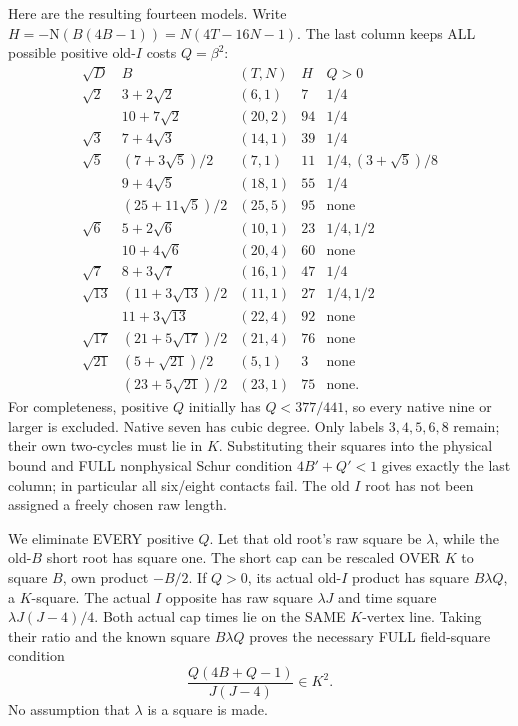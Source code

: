 \documentclass[11pt]{article}
\begin{document}
Here are the resulting fourteen models.
Write \(H=-\mathrm N(B(4B-1))
=N(4T-16N-1)\).
The last column keeps ALL possible
positive old-\(I\) costs \(Q=\beta^2\):
\[
\begin{array}{c|c|c|r|l}
 \sqrt D&B&(T,N)&H&Q>0\\ \hline
 \sqrt2&3+2\sqrt2&(6,1)&7&1/4\\
 &10+7\sqrt2&(20,2)&94&1/4\\
 \sqrt3&7+4\sqrt3&(14,1)&39&1/4\\
 \sqrt5&(7+3\sqrt5)/2&(7,1)&11&1/4,(3+\sqrt5)/8\\
 &9+4\sqrt5&(18,1)&55&1/4\\
 &(25+11\sqrt5)/2&(25,5)&95&\text{none}\\
 \sqrt6&5+2\sqrt6&(10,1)&23&1/4,1/2\\
 &10+4\sqrt6&(20,4)&60&\text{none}\\
 \sqrt7&8+3\sqrt7&(16,1)&47&1/4\\
 \sqrt{13}&(11+3\sqrt{13})/2&(11,1)&27&1/4,1/2\\
 &11+3\sqrt{13}&(22,4)&92&\text{none}\\
 \sqrt{17}&(21+5\sqrt{17})/2&(21,4)&76&\text{none}\\
 \sqrt{21}&(5+\sqrt{21})/2&(5,1)&3&\text{none}\\
 &(23+5\sqrt{21})/2&(23,1)&75&\text{none}.
\end{array}
\]
For completeness, positive \(Q\) initially
has \(Q<377/441\), so every native nine
or larger is excluded.
Native seven has cubic degree.
Only labels \(3,4,5,6,8\) remain;
their own two-cycles must lie in \(K\).
Substituting their squares into the
physical bound and FULL nonphysical
Schur condition \(4B'+Q'<1\) gives
exactly the last column; in particular
all six/eight contacts fail.
The old \(I\) root has not been assigned
a freely chosen raw length.

We eliminate EVERY positive \(Q\).
Let that old root's raw square be
\(\lambda\), while the old-\(B\) short
root has square one.
The short cap can be rescaled OVER \(K\)
to square \(B\), own product \(-B/2\).
If \(Q>0\), its actual old-\(I\) product
has square \(B\lambda Q\), a \(K\)-square.
The actual \(I\) opposite has raw square
\(\lambda J\) and time square
\(\lambda J(J-4)/4\).
Both actual cap times lie on the SAME
\(K\)-vertex line.
Taking their ratio and the known square
\(B\lambda Q\) proves the necessary
FULL field-square condition
\[
                          {\frac{Q(4B+Q-1)}{J(J-4)}}\in K^2 .
\]
No assumption that \(\lambda\) is a
square is made.
\end{document}
